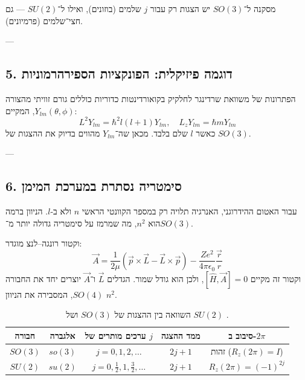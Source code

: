 \begin{formulabox}{מסקנה}
ל־$SO(3)$ יש הצגות רק עבור $j$ שלמים (בוזונים),  
ואילו ל־$SU(2)$ — גם חצי־שלמים (פרמיונים).
\end{formulabox}

---

\subsection*{5. דוגמה פיזיקלית: הפונקציות הספירהרמוניות}

הפתרונות של משוואת שרדינגר לחלקיק בקואורדינטות כדוריות כוללים גורם זוויתי מהצורה \( Y_{lm}(\theta,\phi) \), המקיים:
\[
L^2 Y_{lm} = \hbar^2 l(l+1) Y_{lm}, \quad L_z Y_{lm} = \hbar m Y_{lm}
\]
כאשר $l$ שלם בלבד.  
מכאן שה־$Y_{lm}$ מהווים בדיוק את ההצגות של $SO(3)$.

---

\subsection*{6. סימטריה נסתרת במערכת המימן}

עבור האטום ההידרוגני, האנרגיה תלויה רק במספר הקוונטי הראשי $n$ ולא ב-$l$.  
הניוון ברמה הוא $n^2$, מה שמרמז על סימטריה גדולה יותר מ־$SO(3)$.

\begin{theorembox}{וקטור רונגה–לנצ}
מוגדר:
\[
\vec{A} = \frac{1}{2\mu}(\vec{p}\times\vec{L} - \vec{L}\times\vec{p}) - \frac{Ze^2}{4\pi\epsilon_0}\frac{\vec{r}}{r}
\]
וקטור זה מקיים $[\hat{H}, \vec{A}] = 0$, ולכן הוא גודל שמור.
הגדלים $\vec{L}$ ו־$\vec{A}$ יוצרים יחד את החבורה $SO(4)$, המסבירה את הניוון $n^2$.
\end{theorembox}

\begin{table}[h!]
\centering
\begin{tabular}{|c|c|c|c|c|}
\hline
\textbf{חבורה} & \textbf{אלגברה} & \textbf{ערכים מותרים של $j$} & \textbf{ממד ההצגה} & \textbf{סיבוב ב-$2\pi$} \\
\hline
$SO(3)$ & $so(3)$ & $j = 0, 1, 2, \dots$ & $2j + 1$ & זהות ($R_z(2\pi)=I$) \\
\hline
$SU(2)$ & $su(2)$ & $j = 0, \tfrac{1}{2}, 1, \tfrac{3}{2}, \dots$ & $2j + 1$ & $R_z(2\pi) = (-1)^{2j}$ \\
\hline
\end{tabular}
\caption{השוואה בין ההצגות של $SO(3)$ ושל $SU(2)$ \cite[id=1]{}.}
\end{table}


\begin{center}
\end{center}

